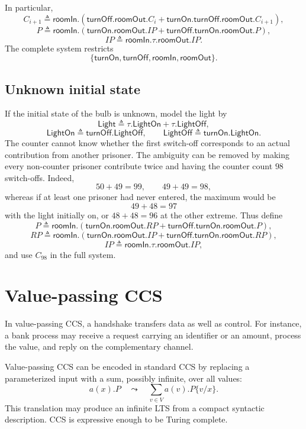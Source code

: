 \documentclass[a4paper]{article}
\begin{document}
In particular,
\[
    C_{i+1}
    \triangleq
    \mathsf{roomIn}.(
      \mathsf{turnOff}.\mathsf{roomOut}.C_i
      +
      \mathsf{turnOn}.\mathsf{turnOff}.\mathsf{roomOut}.C_{i+1}),
\]
\[
    P\triangleq
    \mathsf{roomIn}.(
      \mathsf{turnOn}.\mathsf{roomOut}.IP
      +
      \mathsf{turnOff}.\mathsf{turnOn}.\mathsf{roomOut}.P),
\]
\[
    IP\triangleq\mathsf{roomIn}.\tau.\mathsf{roomOut}.IP.
\]
The complete system restricts
\[
    \{\mathsf{turnOn},\mathsf{turnOff},\mathsf{roomIn},\mathsf{roomOut}\}.
\]

\subsection{Unknown initial state}

If the initial state of the bulb is unknown, model the light by
\[
    \mathsf{Light}
    \triangleq
    \tau.\mathsf{LightOn}+\tau.\mathsf{LightOff},
\]
\[
    \mathsf{LightOn}\triangleq\mathsf{turnOff}.\mathsf{LightOff},
    \qquad
    \mathsf{LightOff}\triangleq\mathsf{turnOn}.\mathsf{LightOn}.
\]
The counter cannot know whether the first switch-off corresponds to an actual contribution from another prisoner.
The ambiguity can be removed by making every non-counter prisoner contribute twice and having the counter count \(98\) switch-offs.
Indeed,
\[
    50+49=99,
    \qquad
    49+49=98,
\]
whereas if at least one prisoner had never entered, the maximum would be
\[
    49+48=97
\]
with the light initially on, or \(48+48=96\) at the other extreme.
Thus define
\[
    P\triangleq
    \mathsf{roomIn}.(
      \mathsf{turnOn}.\mathsf{roomOut}.RP
      +
      \mathsf{turnOff}.\mathsf{turnOn}.\mathsf{roomOut}.P),
\]
\[
    RP\triangleq
    \mathsf{roomIn}.(
      \mathsf{turnOn}.\mathsf{roomOut}.IP
      +
      \mathsf{turnOff}.\mathsf{turnOn}.\mathsf{roomOut}.RP),
\]
\[
    IP\triangleq\mathsf{roomIn}.\tau.\mathsf{roomOut}.IP,
\]
and use \(C_{98}\) in the full system.

\section{Value-passing CCS}

In value-passing CCS, a handshake transfers data as well as control.
For instance, a bank process may receive a request carrying an identifier or an amount, process the value, and reply on the complementary channel.

Value-passing CCS can be encoded in standard CCS by replacing a parameterized input with a sum, possibly infinite, over all values:
\[
    a(x).P
    \quad\leadsto\quad
    \sum_{v\in V}a(v).P\{v/x\}.
\]
This translation may produce an infinite LTS from a compact syntactic description.
CCS is expressive enough to be Turing complete.
\end{document}

